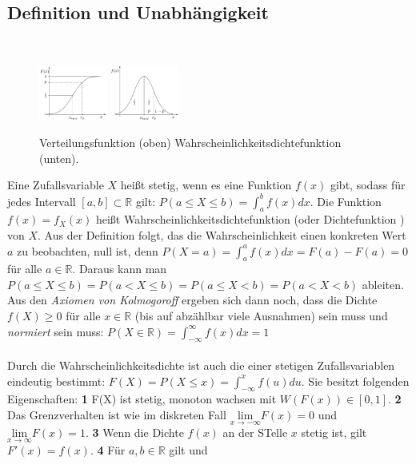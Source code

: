 \subsection{Definition und Unabhängigkeit}
\,
\begin{figure}
    \vspace{-20mm}
    \centering
    \includegraphics[width=0.2\textwidth]{images/6.4_1.png}
    \includegraphics[width=0.2\textwidth]{images/6.4_2.png}
    \caption{Verteilungsfunktion (oben) Wahrscheinlichkeitsdichtefunktion (unten).}
    \vspace{-10mm}
    \label{fig:stetig_f_F}
\end{figure}
 Eine Zufallsvariable $X$ heißt stetig, wenn es eine Funktion $f(x)$ gibt, sodass für jedes Intervall $[a, b] \subset \mathds{R}$ gilt: $P(a \le X \le b) = \int_a^b f(x) dx$. Die Funktion $f(x) = f_X(x)$ heißt Wahrscheinlichkeitsdichtefunktion (oder Dichtefunktion ) von $X$. Aus der Definition folgt, das die Wahrscheinlichkeit einen konkreten Wert $a$ zu beobachten, null ist, denn $P(X = a) = \int_a^a f(x) dx = F(a) - F(a) = 0$ für alle $a\in\mathds{R}$. Daraus kann man $P(a \le X \le b) = P(a < X \le b) = P(a \le X < b) = P(a < X < b)$ ableiten. Aus den \emph{Axiomen von Kolmogoroff} ergeben sich dann noch, dass die Dichte $f(X) \ge 0$ für alle $x \in \mathds{R}$ (bis auf abzählbar viele Ausnahmen) sein muss und \emph{normiert} sein muss: $P(X \in \mathds{R}) = \int_{-\infty}^\infty f(x)dx = 1$ \\\\
Durch die Wahrscheinlichkeitsdichte ist auch die  einer stetigen Zufallsvariablen eindeutig bestimmt: $F(X) = P(X \le x) = \int_{-\infty}^x f(u) du$. Sie besitzt folgenden Eigenschaften: \textbf{1} F(X) ist stetig, monoton wachsen mit $W(F(x)) \in [0, 1]$. \textbf{2} Das Grenzverhalten ist wie im diskreten Fall $\underset{x \rightarrow -\infty}{\text{lim}}F(x) = 0$ und $\underset{x \rightarrow \infty}{\text{lim}}F(x) = 1$. \textbf{3} Wenn die Dichte $f(x)$ an der STelle $x$ stetig ist, gilt $F'(x) = f(x)$. \textbf{4} Für $a, b \in \mathds{R}$ gilt  und  \\\\
